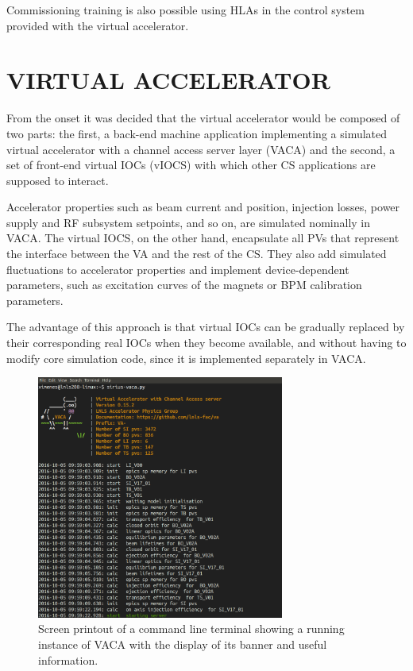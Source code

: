 \documentclass[a4paper,
              ]{jacow}
\begin{document}
Commissioning training is also possible using HLAs in the control system provided with the virtual accelerator.

\section{VIRTUAL ACCELERATOR}

From the onset it was decided that the virtual accelerator would be composed of two parts: the first, a back-end machine
application implementing a simulated virtual accelerator with a channel access server layer (VACA) and the second, a set of
front-end virtual IOCs (vIOCS) with which other CS applications are supposed to interact.

Accelerator properties such as beam current and position, injection losses, power supply and RF subsystem setpoints,
and so on, are simulated nominally in VACA. 
The virtual IOCS, on the other hand, encapsulate all PVs that represent the interface between the VA and the rest of the CS. 
They also add simulated fluctuations to accelerator properties and implement device-dependent parameters, such as excitation curves of the magnets or BPM calibration parameters.

The advantage of this approach is that virtual IOCs can be gradually replaced by their corresponding real IOCs when they become
available, and without having to modify core simulation code, since it is implemented separately in VACA.

\begin{figure}[!htb]
   \centering
   \includegraphics*[width=230pt]{WEPOPRPO21f1}
   \caption{Screen printout of a command line terminal showing a running instance of VACA with the display of its banner and useful information.}
   \label{fig:screen_print}
\end{figure}
\end{document}
